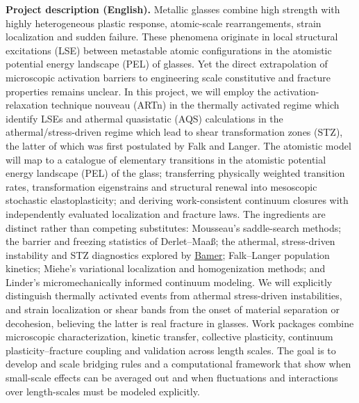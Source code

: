 \documentclass[11pt,a4paper]{article}
\begin{document}
\textbf{Project description (English).} Metallic glasses combine high strength with highly heterogeneous plastic response, atomic-scale rearrangements, strain localization and sudden failure. These phenomena originate in local structural excitations (LSE) between metastable atomic configurations in the atomistic potential energy landscape (PEL) of glasses. Yet the direct extrapolation of microscopic activation barriers to engineering scale constitutive and fracture properties remains unclear. In this project, we will employ the activation-relaxation technique nouveau (ARTn) in the thermally activated regime which identify LSEs and athermal quasistatic (AQS) calculations in the athermal/stress-driven regime which lead to shear transformation zones (STZ), the latter of which was first postulated by Falk and Langer. The atomistic model will map to a catalogue of elementary transitions in the atomistic potential energy landscape (PEL) of the glass; transferring physically weighted transition rates, transformation eigenstrains and structural renewal into mesoscopic stochastic  elastoplasticity; and deriving work-consistent continuum closures with independently evaluated localization and fracture laws. The ingredients are distinct rather than competing substitutes: Mousseau's saddle-search methods; the barrier and freezing statistics of Derlet--Maa\ss{}; the athermal, stress-driven instability and STZ diagnostics explored by \underline{Bamer}; Falk--Langer population kinetics; Miehe's variational localization and homogenization methods; and Linder's micromechanically informed continuum modeling. We will explicitly distinguish thermally activated events from athermal stress-driven instabilities, and strain localization or shear bands from the onset of material separation or decohesion, believing the latter is real fracture in glasses. Work packages combine microscopic characterization, kinetic transfer, collective plasticity, continuum plasticity--fracture coupling and  validation across length scales. The goal is to develop and scale bridging rules and a computational framework that show when small-scale effects can be averaged out and when fluctuations and interactions over length-scales must be modeled explicitly.
\clearpage
\end{document}

